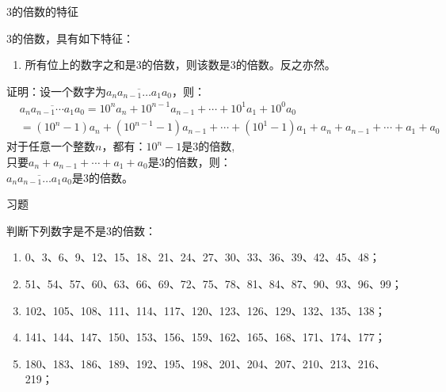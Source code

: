\documentclass[aspectratio=169]{ctexbeamer} %
\date{\today}
\begin{document}
\begin{frame}[t]{3的倍数的特征}
\begin{spacing}{1.2}
\normalsize
3的倍数，具有如下特征：
\begin{enumerate}[label={\arabic*.}]
\item \alert{所有位上的数字之和是3的倍数，则该数是3的倍数。反之亦然。}
\end{enumerate}
证明：设一个数字为$\overline{a_{n}a_{n-1} \dots a_{1}a_{0}}$，则：
\begin{align*}
&\overline{a_{n}a_{n-1} \cdots a_{1}a_{0}} = 10^{n}a_{n} + 10^{n-1}a_{n-1} +\cdots + 10^{1}a_{1} + 10^0a_{0} \\
&=(10^{n}-1)a_{n} + (10^{n-1}-1)a_{n-1}+ \cdots + (10^{1}-1)a_{1} + a_{n} +  a_{n-1} +\cdots + a_{1} + a_{0} 
\end{align*}
对于任意一个整数$n$，都有：$10^{n}-1$是3的倍数, \\
只要$a_{n} +  a_{n-1} +\cdots + a_{1} + a_{0}$是3的倍数，则：\\
$\overline{a_{n}a_{n-1} \dots a_{1}a_{0}}$是3的倍数。
\end{spacing}
\end{frame}

\begin{frame}[t]{习题}
\begin{spacing}{1.5}
\normalsize
判断下列数字是不是3的倍数：
\begin{enumerate}[label={\arabic*.}]
\item 0、3、6、9、12、15、18、21、24、27、30、33、36、39、42、45、48；
\item 51、54、57、60、63、66、69、72、75、78、81、84、87、90、93、96、99；
\item 102、105、108、111、114、117、120、123、126、129、132、135、138；
\item 141、144、147、150、153、156、159、162、165、168、171、174、177；
\item 180、183、186、189、192、195、198、201、204、207、210、213、216、219；
\end{enumerate}

\end{spacing}
\end{frame}
\end{document}
